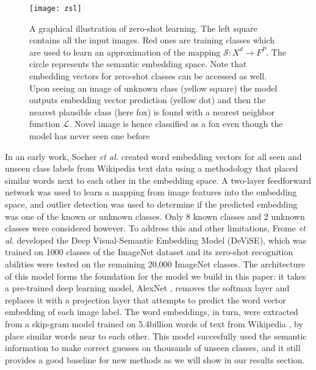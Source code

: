 \documentclass[12pt]{report}
\begin{document}
\begin{figure}
  \centering
	\texttt{[image: zsl]}
	\caption{A graphical illustration of zero-shot learning. The left square contains all the input images. Red ones are training classes which are used to learn an approximation of the mapping $\mathcal{S}:X^d \rightarrow F^P$. The circle represents the semantic embedding space. Note that embedding vectors for zero-shot classes can be accessed as well. Upon seeing an image of unknown class (yellow square) the model outputs embedding vector prediction (yellow dot) and then the nearest plausible class (here fox) is found with a nearest neighbor function $\mathcal{L}$. Novel image is hence classified as a fox even though the model has never seen one before}
	\label{fig:zsl}
\end{figure}

In an early work, Socher \textit{et al.} \cite{Socher} created word embedding vectors for all seen and unseen class labels from Wikipedia text data using a methodology \cite{Huang2012} that placed similar words next to each other in the embedding space. A two-layer feedforward network was used to learn a mapping from image features into the embedding space, and outlier detection was used to determine if the predicted embedding was one of the known or unknown classes. Only 8 known classes and 2 unknown classes were considered however. To address this and other limitations, Frome \textit{et al.} \cite{Frome2013} developed the Deep Visual-Semantic Embedding Model (DeViSE), which was trained on 1000 classes of the ImageNet dataset and its zero-shot recognition abilities were tested on the remaining 20,000 ImageNet classes. The architecture of this model forms the foundation for the model we build in this paper: it takes a pre-trained deep learning model, AlexNet \cite{Krizhevsky2012}, removes the softmax layer and replaces it with a projection layer that attempts to predict the word vector embedding of each image label. The word embeddings, in turn, were extracted from a skip-gram model trained on 5.4billion words of text from Wikipedia \cite{Mikolov2013}, \cite{Mikolov} by place similar words near to each other. This model succesfully used the semantic information to make correct guesses on thousands of unseen classes, and it still provides a good baseline for new methods as we will show in our results section. 
\end{document}
